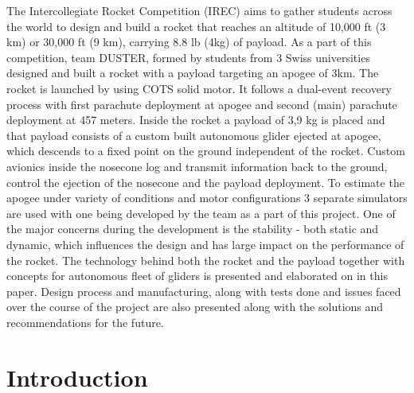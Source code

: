 \documentclass[]{iac}
\begin{document}
{The Intercollegiate Rocket Competition (IREC) aims to gather students across the world to design and build a rocket that reaches an altitude of 10,000 ft (3 km) or 30,000 ft (9 km), carrying 8.8 lb (4kg) of payload. As a part of this competition, team DUSTER, formed by students from 3 Swiss universities designed and built a rocket with a payload targeting an apogee of 3km. The rocket is launched by using COTS solid motor. It follows a dual-event recovery process with first parachute deployment at apogee and second (main) parachute deployment at 457 meters.
Inside the rocket a payload of 3,9 kg is placed and that payload consists of a custom built autonomous glider ejected at apogee, which descends to a fixed point on the ground independent of the rocket.   Custom avionics inside the nosecone log and transmit information back to the ground, control the ejection of the nosecone and the payload deployment.
To estimate the apogee under variety of conditions and motor configurations 3 separate simulators are used with one being developed by the team as a part of this project. One of the major concerns during the development is the stability - both static and dynamic, which influences the design and has large impact on the performance of the rocket.
The technology behind both the rocket and the payload together with concepts for autonomous fleet of gliders is presented and elaborated on in this paper. Design process and manufacturing, along with tests done and issues faced over the course of the project are also presented along with the solutions and recommendations for the future.
}

\maketitle
\section{Introduction}


\end{document}
